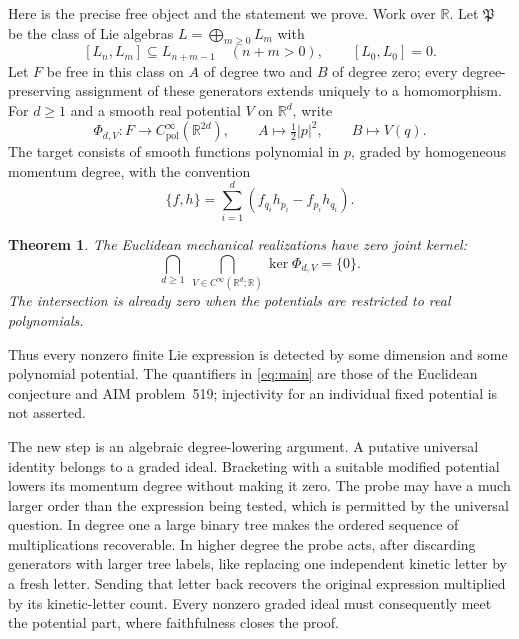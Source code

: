 \documentclass[11pt]{article}
\newtheorem{theorem}{Theorem}[section]
\newcommand{\R}{\mathbb R}
\begin{document}
Here is the precise free object and the statement we prove. Work over $\R$.
Let $\mathfrak P$ be the class of Lie algebras $L=\bigoplus_{m\ge0}L_m$ with
\begin{equation}\label{eq:grading}
 [L_n,L_m]\subseteq L_{n+m-1}\quad(n+m>0),
 \qquad [L_0,L_0]=0.
\end{equation}
Let $F$ be free in this class on $A$ of degree two and $B$ of degree zero;
every degree-preserving assignment of these generators extends uniquely to
a homomorphism. For $d\ge1$ and a smooth real potential $V$ on $\R^d$, write
\[
 \Phi_{d,V}:F\longrightarrow C^\infty_{\mathrm{pol}}(\R^{2d}),
 \qquad A\longmapsto\tfrac12\lvert p\rvert^2,
 \qquad B\longmapsto V(q).
\]
The target consists of smooth functions polynomial in $p$, graded by
homogeneous momentum degree, with the convention
\begin{equation}\label{eq:poisson}
 \{f,h\}=\sum_{i=1}^d(f_{q_i}h_{p_i}-f_{p_i}h_{q_i}).
\end{equation}

\begin{theorem}\label{thm:main}
The Euclidean mechanical realizations have zero joint kernel:
\begin{equation}\label{eq:main}
 \bigcap_{d\ge1}\ \bigcap_{V\in C^\infty(\R^d;\R)}
       \ker\Phi_{d,V}=\{0\}.
\end{equation}
The intersection is already zero when the potentials are restricted to real
polynomials.
\end{theorem}

Thus every nonzero finite Lie expression is detected by some dimension and
some polynomial potential. The quantifiers in \eqref{eq:main} are those of
the Euclidean conjecture and AIM problem~519; injectivity for an individual
fixed potential is not asserted.

The new step is an algebraic degree-lowering argument. A putative universal
identity belongs to a graded ideal. Bracketing with a suitable modified
potential lowers its momentum degree without making it zero. The probe may
have a much larger order than the expression being tested, which is permitted
by the universal question. In degree one a large binary tree makes the
ordered sequence of multiplications recoverable. In higher degree the probe
acts, after discarding generators with larger tree labels, like replacing one
independent kinetic letter by a fresh letter. Sending that letter back
recovers the original expression multiplied by its kinetic-letter count.
Every nonzero graded ideal must consequently meet the potential part, where
faithfulness closes the proof.
\end{document}
